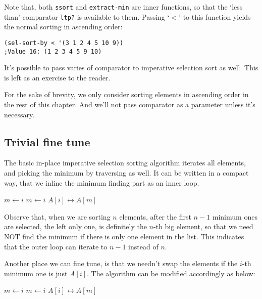 \documentclass{article}
\begin{document}
Note that, both \texttt{ssort} and \texttt{extract-min} are inner functions, so that the
`less than' comparator \texttt{ltp?} is available to them. Passing `$<$' to this function
yields the normal sorting in ascending order:

\lstset{language=Lisp}
\begin{lstlisting}
(sel-sort-by < '(3 1 2 4 5 10 9))
;Value 16: (1 2 3 4 5 9 10)
\end{lstlisting}

It's possible to pass varies of comparator to imperative selection sort as well. This
is left as an exercise to the reader.

For the sake of brevity, we only consider sorting elements in ascending order in
the rest of this chapter. And we'll not pass comparator as a parameter unless it's
necessary.

\subsection{Trivial fine tune}

The basic in-place imperative selection sorting algorithm iterates all elements, and picking the
minimum by traversing as well. It can be written in a compact way, that we
inline the minimum finding part as an inner loop.

\begin{algorithmic}
    \State $m \gets i$
        \State $m \gets i$
      \EndIf
    \EndFor
    \State {} $A[i] \leftrightarrow A[m]$
  \EndFor
\EndProcedure
\end{algorithmic}

Observe that, when we are sorting $n$ elements, after the first $n-1$ minimum ones are selected,
the left only one, is definitely the $n$-th big element, so that we need NOT find the
minimum if there is only one element in the list. This indicates that the outer loop can
iterate to $n-1$ instead of $n$.

Another place we can fine tune, is that we needn't swap the elements if the $i$-th minimum one
is just $A[i]$. The algorithm can be modified accordingly as below:

\begin{algorithmic}
    \State $m \gets i$
        \State $m \gets i$
      \EndIf
    \EndFor
      \State {} $A[i] \leftrightarrow A[m]$
    \EndIf
  \EndFor
\EndProcedure
\end{algorithmic}
\end{document}
